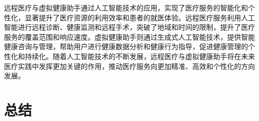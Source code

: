 远程医疗与虚拟健康助手通过人工智能技术的应用，实现了医疗服务的智能化和个性化，显著提升了医疗资源的利用效率和患者的就医体验。远程医疗服务利用人工智能进行远程诊断、健康监测和远程手术，突破了地域和时间的限制，提升了医疗服务的覆盖范围和响应速度。虚拟健康助手则通过生成式人工智能技术，提供智能健康咨询与管理，帮助用户进行健康数据分析和健康行为指导，促进健康管理的个性化和持续化。随着人工智能技术的不断发展，远程医疗与虚拟健康助手将在未来医疗实践中发挥更加关键的作用，推动医疗服务向更加精准、高效和个性化的方向发展。

\section {总结}







